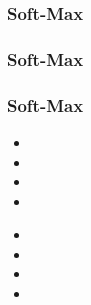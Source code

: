 \documentclass{formation}
\begin{document}
\begin{frame}
  \frametitle{Soft-Max}
\end{frame}

\begin{frame}
  \frametitle{Soft-Max}
\end{frame}

\begin{frame}
  \frametitle{Soft-Max}

  
  \begin{itemize}
  \item 
  \item 
  \item 
  \item 
  \end{itemize}

  \begin{minipage}[l]{0.49\linewidth}
  \end{minipage}\hfill
  \begin{minipage}[l]{0.49\linewidth}
  \end{minipage}\hfill

  \begin{minipage}[l]{0.49\linewidth}
      \begin{itemize}
      \item 
      \item 
      \item 
      \item 
      \end{itemize}
  \end{minipage}\hfill
  \begin{minipage}[l]{0.49\linewidth}
  \end{minipage}\hfill

\end{frame}
\end{document}
